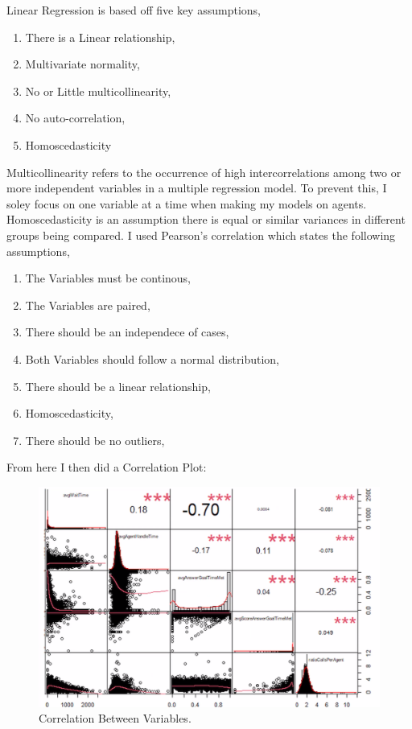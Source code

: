 \documentclass[12pt]{article}
\begin{document}
  Linear Regression is based off five key assumptions,
  \begin{enumerate}
  \item There is a Linear relationship,
  \item Multivariate normality,
  \item No or Little multicollinearity,
  \item No auto-correlation,
  \item Homoscedasticity
\end{enumerate} Multicollinearity refers to the occurrence of high intercorrelations among two or more independent variables in a multiple regression model.
To prevent this, I soley focus on one variable at a time when making my models on agents. Homoscedasticity is an assumption there is equal or similar variances in different groups being compared.
I used Pearson's correlation which states the following assumptions,
\begin{enumerate}
  \item The Variables must be continous,
  \item The Variables are paired,
  \item There should be an independece of cases,
  \item Both Variables should follow a normal distribution,
  \item There should be a linear relationship,
  \item Homoscedasticity,
  \item There should be no outliers,
\end{enumerate}
From here I then did a Correlation Plot:
\begin{figure}[H]
  \centering
  \includegraphics[width=\textwidth]{Correlation.png}
  \caption{Correlation Between Variables.}
  \label{fig:Correlation}
\end{figure}
\end{document}
